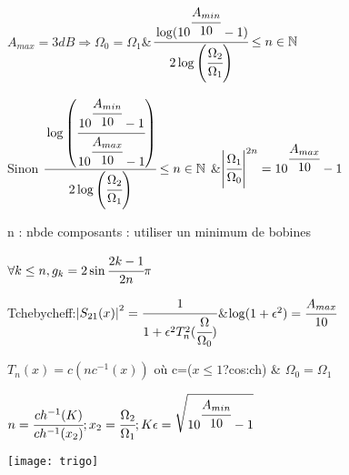 \documentclass[10pt,a4paper]{article}
\begin{document}
\begin{multicols}{2}
$A_{max} = 3dB \Rightarrow \Omega_0=\Omega_1$\&$\cfrac{\log(10^{\cfrac{A_{min}}{10}}-1)}{2\log\left(\cfrac{\Omega_2}{\Omega_1}\right)} \leq n \in \mathbb{N}$

Sinon $\cfrac{\log\left(\cfrac{10^{\cfrac{A_{min}}{10}}-1}{10^{\cfrac{A_{max}}{10}}-1}\right)}{2\log\left(\cfrac{\Omega_2}{\Omega_1}\right)} \leq n \in \mathbb{N}$ \&$\left|\cfrac{\Omega_1}{\Omega_0}\right|^{2n} = 10^{\cfrac{A_{max}}{10}}-1$

n : nbde composants : utiliser un minimum de bobines

$\forall k \leq n,g_k=2\sin\cfrac{2k-1}{2n}\pi$

Tchebycheff:$\left|S_{21}(x)\right|^2 = \cfrac{1}{1+\epsilon^2T_n^2(\cfrac{\Omega}{\Omega_0})}$\&$\log(1+\epsilon^2)=\cfrac{A_{max}}{10}$

$T_n(x) = c\left(nc^{-1}(x)\right)$ où c=($x\leq1$?cos:ch) \& $\Omega_0 = \Omega_1$

$n=\cfrac{ch^{-1}(K)}{ch^{-1}(x_2)};x_2=\cfrac{\Omega_2}{\Omega_1};K\epsilon=\sqrt{10^{\cfrac{A_{min}}{10}}-1}$


\end{multicols}

\texttt{[image: trigo]}
\end{document}
